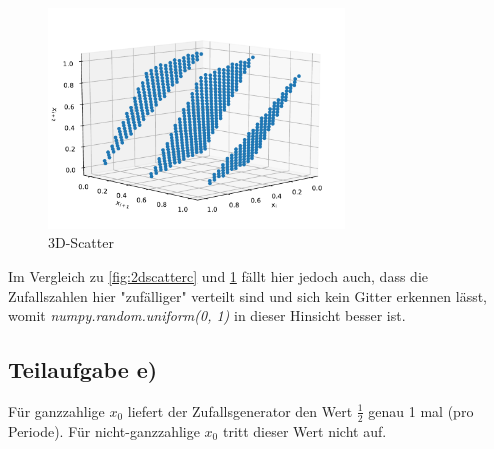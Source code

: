 \begin{figure}[H]
  \centering
  \includegraphics[width=0.7\textwidth]{Aufgabe06/Teilaufgabe_c)_3D-Scatter.pdf}
  \caption{3D-Scatter}
  \label{fig:3dscatterc}
\end{figure}

Im Vergleich zu \ref{fig:2dscatterc} und \ref{fig:3dscatterc} fällt hier jedoch auch, dass die Zufallszahlen hier "zufälliger" verteilt sind und sich kein Gitter erkennen lässt, womit \textit{numpy.random.uniform(0, 1)} in dieser Hinsicht besser ist.

\subsection{Teilaufgabe e)}
Für ganzzahlige $x_0$ liefert der Zufallsgenerator den Wert $\frac{1}{2}$ genau 1 mal (pro Periode).
Für nicht-ganzzahlige $x_0$ tritt dieser Wert nicht auf.
